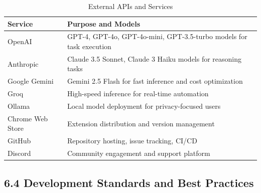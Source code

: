 \documentclass[12pt,a4paper]{article}
\begin{document}
\begin{table}[h]
\centering
\small
\begin{tabular}{|l|p{8cm}|}
\hline
\textbf{Service} & \textbf{Purpose and Models} \\
\hline
OpenAI & GPT-4, GPT-4o, GPT-4o-mini, GPT-3.5-turbo models for task execution \\
\hline
Anthropic & Claude 3.5 Sonnet, Claude 3 Haiku models for reasoning tasks \\
\hline
Google Gemini & Gemini 2.5 Flash for fast inference and cost optimization \\
\hline
Groq & High-speed inference for real-time automation \\
\hline
Ollama & Local model deployment for privacy-focused users \\
\hline
Chrome Web Store & Extension distribution and version management \\
\hline
GitHub & Repository hosting, issue tracking, CI/CD \\
\hline
Discord & Community engagement and support platform \\
\hline
\end{tabular}
\caption{External APIs and Services}
\end{table}



\subsection*{\textbf{6.4 Development Standards and Best Practices}}
\end{document}

